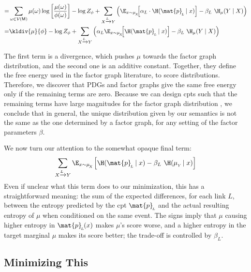 \documentclass{article}
\newcommand{\bp}[1][L]{\mat{p}_{\!_#1\!}}
\newcommand{\V}{\mathcal V}
\newcommand{\sfM}{\mathsf M}
\newcommand{\alle}[1][L]{_{ X \xrightarrow{\!\!#1} Y }}
\newcommand{\ubrace}[3][blue]{\begingroup\color{#1} \vphantom{#2}\smash{\underbrace{\color{black}#2}_{#3}}\endgroup}
\begin{document}
\begin{align*}
%		
		=& \sum_{\omega \in \V(\sfM)} \mu(\omega) \log \left[
			\frac{\mu(\omega)}{\phi(\omega)  } 	\right] - \log Z_\phi  + \sum\alle \left( \E_{x \sim \mu_{\!_X}}\!\! \Big[ \alpha_L \cdot  \H(\bp \mid x)\Big] - \beta_L \ \H_\mu(Y \mid X) \right) \\
		=& \kldiv{\mu}{\phi} - \log Z_\phi + \sum\alle \left( \alpha_L \E_{x \sim \mu_{\!_X}}\!\! \Big[  \H(\bp \mid x)\Big] - \beta_L \ \H_\mu(Y \mid X) \right)
	\end{align*}
	
	
	The first term is a divergence, which pushes $\mu$ towards the factor graph distribution, and the second one is an additive constant. Together, they define the free energy used in the factor graph literature, to score distributions. Therefore, we discover that PDGs and factor graphs give the same free energy only if the remaining terms are zero. Because we can design cpts such that the remaining terms have large magnitudes for the factor graph distribution , we conclude that in general, the unique distribution given by our semantics is not the same as the one determined by a factor graph, for any setting of the factor parameters $\beta$. 
	
	
	We now turn our attention to the somewhat opaque final term:
	\[ \sum\alle \E_{x \sim \mu_{\!_X}} \Big[ \H(\bp \mid x) - \beta_L \ \H(\mu_{_Y}\! \mid x) \Big] 
	  \]
	Even if unclear what this term does to our minimization, this has a straightforward meaning: the sum of the expected differences, for each link $L$, between the entropy predicted by the cpt $\bp$ and the actual resulting entropy of $\mu$ when conditioned on the same event.
	The signs imply that $\mu$ causing higher entropy in $\bp(x)$ makes $\mu$'s score worse, and a higher entropy in the target marginal $\mu$ makes its score better; the trade-off is controlled by $\beta_L$.
	
	\subsection{Minimizing This}
	\begingroup\color{gray!50!black}
	
\end{document}

